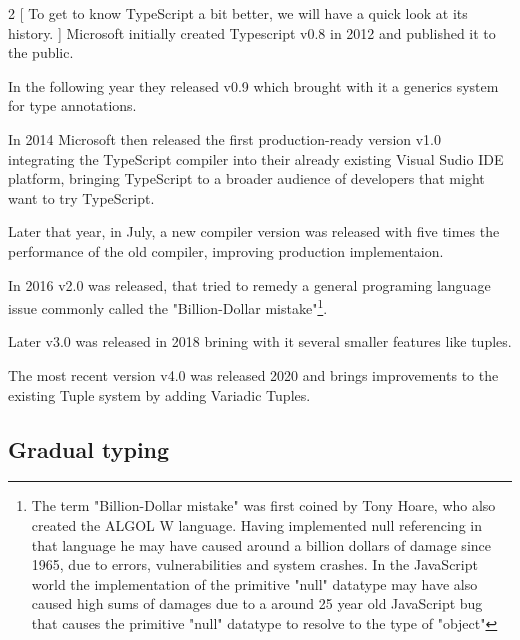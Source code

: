 \documentclass[english,runningheads, letterpaper]{llncs}[2018/03/10]
\begin{document}
\begin{multicols}{2}
[
\noindent
To get to know TypeScript a bit better, we will have a quick look at its history.
]
\noindent
Microsoft initially created Typescript v0.8 in 2012 and published it to the public. 

\medskip
\noindent
In the following year they released v0.9 which brought with it a generics system for type annotations. 

\medskip
\noindent
In 2014 Microsoft then released the first production-ready version v1.0 integrating the TypeScript compiler into their already existing Visual Sudio IDE platform, bringing TypeScript to a broader audience of developers that might want to try TypeScript. 

\medskip
\noindent
Later that year, in July, a new compiler version was released with five times the performance of the old compiler, improving production implementaion. 

\medskip
\noindent
In 2016 v2.0 was released, that tried to remedy a general programing language issue commonly called the "Billion-Dollar mistake"\footnote{The term "Billion-Dollar mistake" was first coined by Tony Hoare, who also created the ALGOL W language. Having implemented null referencing in that language he may have caused around a billion dollars of damage since 1965, due to errors, vulnerabilities and system crashes. In the JavaScript world the implementation of the primitive "null" datatype may have also caused high sums of damages due to a around 25 year old JavaScript bug that causes the primitive "null" datatype to resolve to the type of "object"\cite{ref_billion_dollar_mistake}}. 

\medskip
\noindent
Later v3.0 was released in 2018 brining with it several smaller features like tuples. 

\medskip
\noindent
The most recent version v4.0 was released 2020 and brings improvements to the existing Tuple system by adding Variadic Tuples.
\end{multicols}

\subsection{Gradual typing \cite{ref_gradual_typing}}
\end{document}
